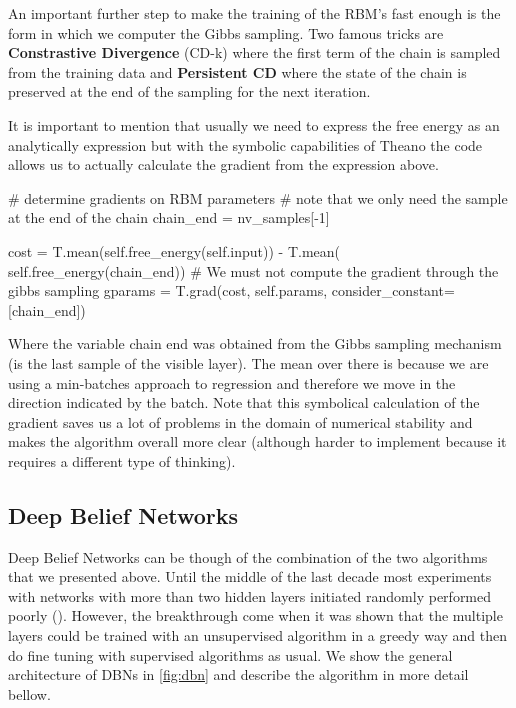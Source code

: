 \documentclass[11pt,a4paper]{article}
\begin{document}
An important further step to make the training of the RBM's fast enough is the form in which we computer the Gibbs sampling. Two famous tricks are \textbf{Constrastive Divergence} (CD-k) where the first term of the chain is sampled from the training data and \textbf{Persistent CD} where the state of the chain is preserved at the end of the sampling for the next iteration. 

It is important to mention that usually we need to express the free energy as an analytically expression but with the symbolic capabilities of Theano the code allows us to actually calculate the gradient from the expression above. 

\begin{python}
   # determine gradients on RBM parameters
        # note that we only need the sample at the end of the chain
        chain_end = nv_samples[-1]

        cost = T.mean(self.free_energy(self.input)) - T.mean(
            self.free_energy(chain_end))
        # We must not compute the gradient through the gibbs sampling
        gparams = T.grad(cost, self.params, consider_constant=[chain_end])
\end{python}

Where the variable chain end was obtained from the Gibbs sampling mechanism (is the last sample of the visible layer). The mean over there is because we are using a min-batches approach to regression and therefore we move in the direction indicated by the batch. Note that this symbolical calculation of the gradient saves us a lot of problems in the domain of numerical stability and makes the algorithm overall more clear (although harder to implement because it requires a different type of thinking).

\subsection{Deep Belief Networks}


Deep Belief Networks can be though of the combination of the two  algorithms that we presented above. Until the middle of the last decade most experiments with networks with more than two hidden layers initiated randomly performed poorly (\cite{bengio2009learning}). However, the breakthrough come when it was shown that the multiple layers could be trained with an unsupervised algorithm in a greedy way and then do fine tuning with supervised algorithms as usual. We show the general architecture of DBNs in \ref{fig:dbn} and describe the algorithm in more detail bellow. 
\end{document}
